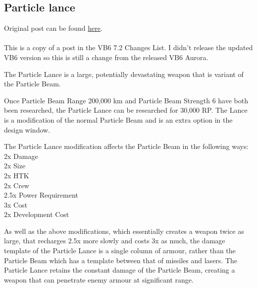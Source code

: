 \documentclass[../../Aurora C# unofficial manual.tex]{subfiles}
\begin{document}
	\subsection{Particle lance}
	Original post can be found
	\href{http://aurora2.pentarch.org/index.php?topic=8495.msg102678#msg102678}{here}.
	\\\\
	
	This is a copy of a post in the VB6 7.2 Changes List. I didn't release the updated VB6 version so this is still a change from the released VB6 Aurora.
	
	The Particle Lance is a large, potentially devastating weapon that is variant of the Particle Beam.
	
	Once Particle Beam Range 200,000 km and Particle Beam Strength 6 have both been researched, the Particle Lance can be researched for 30,000 RP. The Lance is a modification of the normal Particle Beam and is an extra option in the design window.
	
	The Particle Lance modification affects the Particle Beam in the following ways:\\
	2x Damage\\
	2x Size\\
	2x HTK\\
	2x Crew\\
	2.5x Power Requirement\\
	3x Cost\\
	2x Development Cost
	
	As well as the above modifications, which essentially creates a weapon twice as large, that recharges 2.5x more slowly and costs 3x as much, the damage template of the Particle Lance is a single column of armour, rather than the Particle Beam which has a template between that of missiles and lasers. The Particle Lance retains the constant damage of the Particle Beam, creating a weapon that can penetrate enemy armour at significant range.
	
\end{document}
